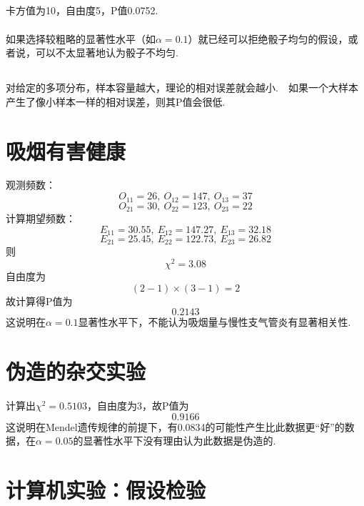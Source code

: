 \documentclass{article}
\begin{document}
\begin{CJK}{UTF8}{gbsn}
\subsection{}
卡方值为10，自由度5，P值0.0752.
\\\\
如果选择较粗略的显著性水平（如$\alpha=0.1$）就已经可以拒绝骰子均匀的假设，或者说，可以不太显著地认为骰子不均匀.
\subsection{}
对给定的多项分布，样本容量越大，理论的相对误差就会越小.\ \ 如果一个大样本产生了像小样本一样的相对误差，则其P值会很低.
\section{吸烟有害健康}
观测频数：
$$ O_{11}=26,\ O_{12}=147,\ O_{13}=37 $$
$$ O_{21}=30,\ O_{22}=123,\ O_{23}=22 $$
计算期望频数：
$$ E_{11}=30.55,\ E_{12}=147.27,\ E_{13}=32.18 $$
$$ E_{21}=25.45,\ E_{22}=122.73,\ E_{23}=26.82 $$
则
$$ \chi^{2}=3.08 $$
自由度为
$$ (2-1)\times(3-1)=2 $$
故计算得P值为
$$ 0.2143 $$
这说明在$\alpha=0.1$显著性水平下，不能认为吸烟量与慢性支气管炎有显著相关性.
\section{伪造的杂交实验}
计算出$\chi^{2}=0.5103$，自由度为3，故P值为
$$ 0.9166 $$
这说明在Mendel遗传规律的前提下，有0.0834的可能性产生比此数据更“好”的数据，在$\alpha=0.05$的显著性水平下没有理由认为此数据是伪造的.
\section{计算机实验：假设检验}

\end{CJK}
\end{document}
